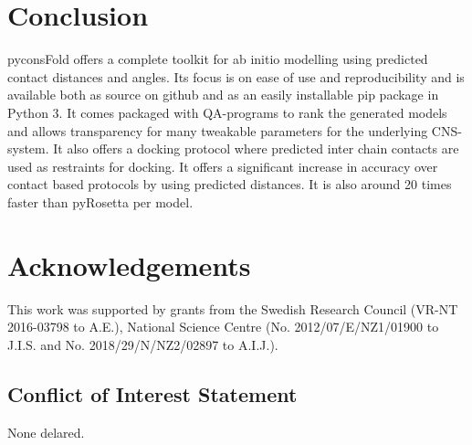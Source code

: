 \documentclass{bioinfo}
\begin{document}
\section{Conclusion}
pyconsFold offers a complete toolkit for ab initio modelling using predicted contact distances and angles. Its focus is on ease of use and reproducibility and is available both as source on github and as an easily installable pip package in Python 3. It comes packaged with QA-programs to rank the generated models and allows transparency for many tweakable parameters for the underlying CNS-system. It also offers a docking protocol where predicted inter chain contacts are used as restraints for docking. It offers a significant increase in accuracy over contact based protocols by using predicted distances. It is also around 20 times faster than pyRosetta per model.

%
%

\section*{Acknowledgements}
This work was supported by grants from 
the Swedish Research Council (VR-NT 2016-03798 to A.E.),
National Science Centre (No. 2012/07/E/NZ1/01900 to J.I.S. and
No. 2018/29/N/NZ2/02897 to A.I.J.).
  \subsection*{Conflict of Interest Statement}
  None delared.

% 

%
%
%
%
%
%
%

\end{document}
